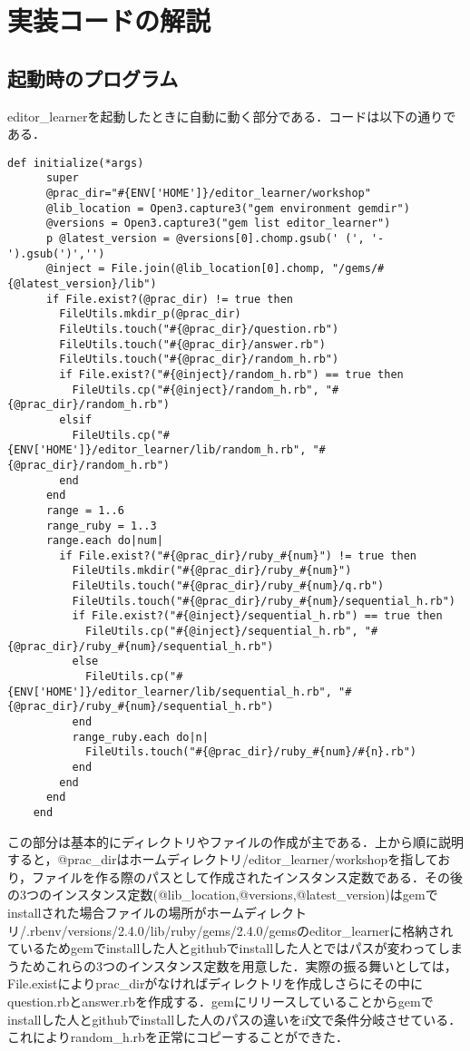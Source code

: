 \chapter{実装コードの解説}\label{ux5b9fux88c5ux30b3ux30fcux30c9ux306eux89e3ux8aac}

    \section{起動時のプログラム}\label{ux8d77ux52d5ux6642ux306eux30d7ux30edux30b0ux30e9ux30e0}

editor\_learnerを起動したときに自動に動く部分である．コードは以下の通りである．

\begin{verbatim}
def initialize(*args)
      super
      @prac_dir="#{ENV['HOME']}/editor_learner/workshop"
      @lib_location = Open3.capture3("gem environment gemdir")
      @versions = Open3.capture3("gem list editor_learner")
      p @latest_version = @versions[0].chomp.gsub(' (', '-').gsub(')','')
      @inject = File.join(@lib_location[0].chomp, "/gems/#{@latest_version}/lib")
      if File.exist?(@prac_dir) != true then
        FileUtils.mkdir_p(@prac_dir)
        FileUtils.touch("#{@prac_dir}/question.rb")
        FileUtils.touch("#{@prac_dir}/answer.rb")
        FileUtils.touch("#{@prac_dir}/random_h.rb")
        if File.exist?("#{@inject}/random_h.rb") == true then
          FileUtils.cp("#{@inject}/random_h.rb", "#{@prac_dir}/random_h.rb")
        elsif
          FileUtils.cp("#{ENV['HOME']}/editor_learner/lib/random_h.rb", "#{@prac_dir}/random_h.rb")
        end
      end
      range = 1..6
      range_ruby = 1..3
      range.each do|num|
        if File.exist?("#{@prac_dir}/ruby_#{num}") != true then
          FileUtils.mkdir("#{@prac_dir}/ruby_#{num}")
          FileUtils.touch("#{@prac_dir}/ruby_#{num}/q.rb")
          FileUtils.touch("#{@prac_dir}/ruby_#{num}/sequential_h.rb")
          if File.exist?("#{@inject}/sequential_h.rb") == true then
            FileUtils.cp("#{@inject}/sequential_h.rb", "#{@prac_dir}/ruby_#{num}/sequential_h.rb")
          else
            FileUtils.cp("#{ENV['HOME']}/editor_learner/lib/sequential_h.rb", "#{@prac_dir}/ruby_#{num}/sequential_h.rb")
          end
          range_ruby.each do|n|
            FileUtils.touch("#{@prac_dir}/ruby_#{num}/#{n}.rb")
          end
        end
      end
    end
\end{verbatim}

この部分は基本的にディレクトリやファイルの作成が主である．上から順に説明すると，@prac\_dirはホームディレクトリ/editor\_learner/workshopを指しており，ファイルを作る際のパスとして作成されたインスタンス定数である．その後の3つのインスタンス定数(@lib\_location,@versions,@latest\_version)はgemでinstallされた場合ファイルの場所がホームディレクトリ/.rbenv/versions/2.4.0/lib/ruby/gems/2.4.0/gemsのeditor\_learnerに格納されているためgemでinstallした人とgithubでinstallした人とではパスが変わってしまうためこれらの3つのインスタンス定数を用意した．実際の振る舞いとしては，File.existによりprac\_dirがなければディレクトリを作成しさらにその中にquestion.rbとanswer.rbを作成する．gemにリリースしていることからgemでinstallした人とgithubでinstallした人のパスの違いをif文で条件分岐させている．これによりrandom\_h.rbを正常にコピーすることができた．

